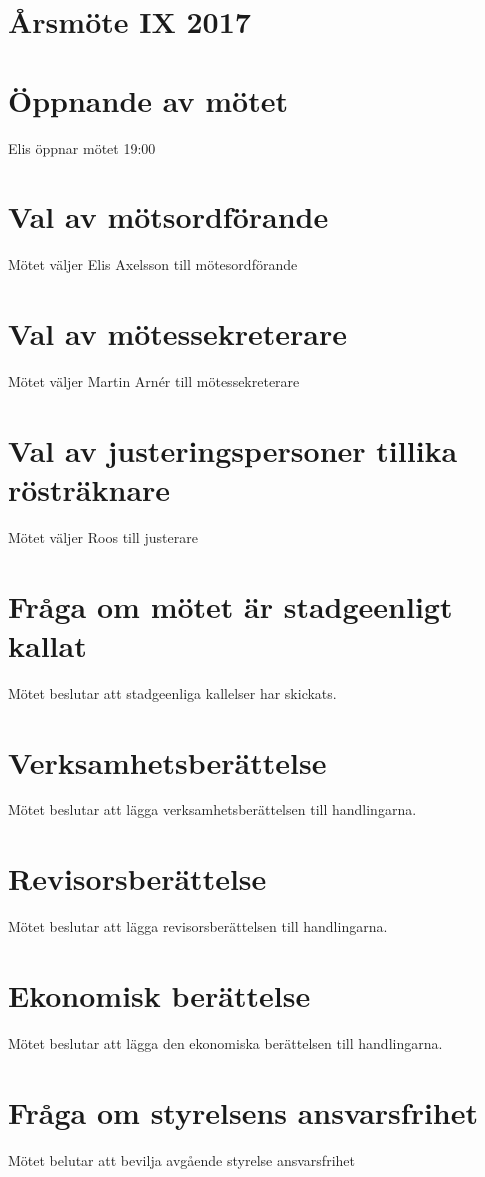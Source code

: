 \documentclass[a4paper,11pt,oneside]{article}
\begin{document}
\section*{Årsmöte IX 2017}

\section{Öppnande av mötet}
Elis öppnar mötet 19:00

\section{Val av mötsordförande}
Mötet väljer Elis Axelsson till mötesordförande

\section{Val av mötessekreterare}
Mötet väljer Martin Arnér till mötessekreterare

\section{Val av justeringspersoner tillika rösträknare}
Mötet väljer Roos till justerare

\section{Fråga om mötet är stadgeenligt kallat}
Mötet beslutar att stadgeenliga kallelser har skickats.

\section{Verksamhetsberättelse}
Mötet beslutar att lägga verksamhetsberättelsen till handlingarna.

\section{Revisorsberättelse}
Mötet beslutar att lägga revisorsberättelsen till handlingarna.

\section{Ekonomisk berättelse}
Mötet beslutar att lägga den ekonomiska berättelsen till handlingarna.

\section{Fråga om styrelsens ansvarsfrihet}
Mötet belutar att bevilja avgående styrelse ansvarsfrihet
\end{document}
